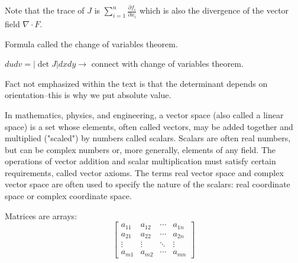 \documentclass{scrreprt}
\begin{document}
\begin{remark}
	Note that the trace of $J$ is $\sum_{i=1}^{n}\frac{\partial f_i}{\partial x_i}$ which
	is also the divergence of the vector field $\nabla \cdot F$.
\end{remark}

Formula called the change of variables theorem.

$dudv=|\det J|dxdy\rightarrow $ connect with change of variables theorem.

Fact not emphasized within the text is that the determinant depends on
orientation--this is why we put absolute value.

\begin{definition}
	In mathematics, physics, and engineering, a vector space (also called a
	linear space) is a set whose elements, often called vectors, may be added
	together and multiplied ("scaled") by numbers called scalars.
	Scalars are often real numbers, but can be complex numbers or, more
	generally, elements of any field. The operations of vector addition and
	scalar multiplication must satisfy certain requirements, called vector
	axioms. The terms real vector space and complex vector space are often used
	to specify the nature of the scalars: real coordinate space or complex coordinate space.
\end{definition}

Matrices are arrays:
\[
	\begin{bmatrix}
		a_{11} & a_{12} & \cdots & a_{1n} \\
		a_{21} & a_{22} & \cdots & a_{2n} \\
		\vdots & \vdots & \ddots & \vdots \\
		a_{m1} & a_{m2} & \cdots & a_{mn}
	\end{bmatrix}
\]
\end{document}
